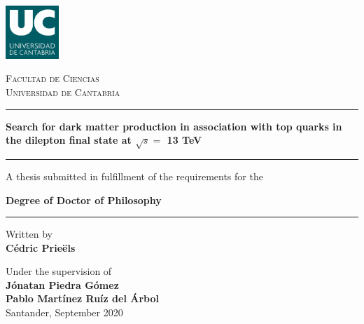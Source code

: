\documentclass[a4paper, 10pt, openright]{report}
\begin{document}
\renewcommand{\listfigurename}{List of figures} 
\renewcommand{\listtablename}{List of tables}
\renewcommand{\floatpagefraction}{.95}%


\setlength{\parfillskip}{0pt plus\dimexpr\textwidth-2\parindent}

\doublespacing
{}\baselineskip
\setlength{\parindent}{0pt}	

\renewcommand{\arraystretch}{1.5}

\begin{titlepage}

	\centering
	\includegraphics[width=0.15\textwidth]{figs/image_UC.png}\par
	{\scshape\LARGE Facultad de Ciencias \\ \vspace{-15pt} Universidad de Cantabria \par}
	
	\vspace{0.8cm}
	
	\noindent\rule{15cm}{0.4pt}\par 
	{\huge\bfseries Search for dark matter production in association with top quarks in the dilepton final state at $\sqrt{s} = $ 13 TeV\par \vspace{10pt}}
	\noindent\rule{15cm}{0.4pt}\par 
	
	{\vspace{20pt} \Large A thesis submitted in fulfillment of the requirements for the \par \LARGE \textbf{Degree of Doctor of Philosophy} \vspace{20pt} \par \noindent\rule{15cm}{0.4pt}}
	
	\vspace{0.8cm}
	{\Large Written by \\ \textbf{C\'{e}dric Prie\"{e}ls}\par}
	\vspace{0.5cm}
	{\Large Under the supervision of \\ \textbf{J\'{o}natan Piedra G\'{o}mez} \\
	\vspace{-10pt}
	\textbf{Pablo Mart\'{i}nez Ru\'{i}z del \'{A}rbol}\\}
	\vspace{1.4cm}
	{\Large Santander, September 2020}
	\vfill

\end{titlepage}
\end{document}
